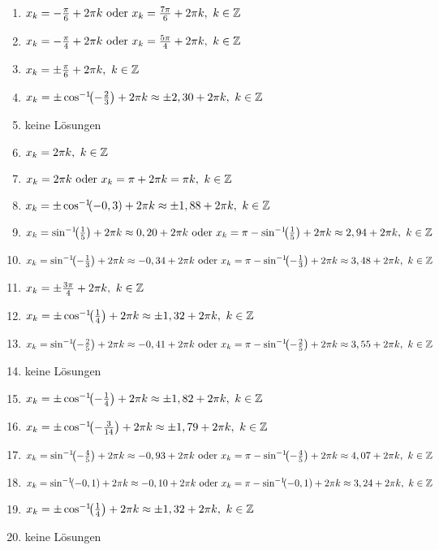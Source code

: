\begin{Answer}[ref=sincosGleichungenA1]
	\begin{enumerate}[label=\alph*)]
		\item \(x_k=-\frac{\pi}{6} +2\pi k\text{ oder }x_k=\frac{7\pi}{6} +2\pi k,\ k\in\mathbb{Z}\)
		\item \(x_k=-\frac{\pi}{4} +2\pi k\text{ oder }x_k=\frac{5\pi}{4} +2\pi k,\ k\in\mathbb{Z}\)
		\item \(x_k=\pm \frac{\pi}{6} +2\pi k,\ k\in\Z\)
		\item \(x_k=\pm \arccoss{-\frac{2}{3}} +2\pi k\approx \pm 2,30 +2\pi k,\ k\in\Z\)
		\item keine Lösungen
		\item \(x_k=2\pi k,\ k\in\mathbb{Z}\)
		\item \(x_k=2\pi k\text{ oder }x_k=\pi +2\pi k=\pi k,\ k\in\mathbb{Z}\)
		\item \(x_k=\pm \arccoss{-0,3} +2\pi k\approx \pm 1,88 +2\pi k,\ k\in\Z\)
		\item \(x_k=\arcsinn{\frac{1}{5}} +2\pi k\approx 0,20+2\pi k\text{ oder }x_k=\pi-\arcsinn{\frac{1}{5}} +2\pi k\approx 2,94+2\pi k,\ k\in\Z\)
		\item \(x_k=\arcsinn{-\frac{1}{3}} +2\pi k\approx -0,34+2\pi k\text{ oder }x_k=\pi-\arcsinn{-\frac{1}{3}} +2\pi k\approx 3,48+2\pi k,\ k\in\Z\)
		\item \(x_k=\pm \frac{3\pi}{4} +2\pi k,\ k\in\Z\)
		\item \(x_k=\pm \arccoss{\frac{1}{4}} +2\pi k\approx \pm 1,32 +2\pi k,\ k\in\Z\)
		\item \(x_k=\arcsinn{-\frac{2}{5}} +2\pi k\approx -0,41+2\pi k\text{ oder }x_k=\pi-\arcsinn{-\frac{2}{5}} +2\pi k\approx 3,55+2\pi k,\ k\in\Z\)
		\item keine Lösungen
		\item \(x_k=\pm \arccoss{-\frac{1}{4}} +2\pi k\approx \pm 1,82 +2\pi k,\ k\in\Z\)
		\item \(x_k=\pm \arccoss{-\frac{3}{14}} +2\pi k\approx \pm 1,79 +2\pi k,\ k\in\Z\)
		\item \(x_k=\arcsinn{-\frac{4}{5}} +2\pi k\approx -0,93+2\pi k\text{ oder }x_k=\pi-\arcsinn{-\frac{4}{5}} +2\pi k\approx 4,07+2\pi k,\ k\in\Z\)
		\item \(x_k=\arcsinn{-0,1} +2\pi k\approx -0,10+2\pi k\text{ oder }x_k=\pi-\arcsinn{-0,1} +2\pi k\approx 3,24+2\pi k,\ k\in\Z\)
		\item \(x_k=\pm \arccoss{\frac{1}{4}} +2\pi k\approx \pm 1,32 +2\pi k,\ k\in\Z\)
		\item keine Lösungen

\end{enumerate}
\end{Answer}
